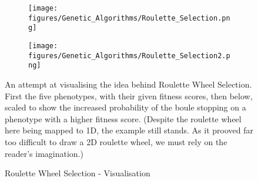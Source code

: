 \begin{figure}[H]
    \centering
    \begin{subfigure}[b]{0.8\textwidth}
        \centering
        \texttt{[image: figures/Genetic\_Algorithms/Roulette\_Selection.png]}
    \end{subfigure}
    \begin{subfigure}[b]{0.8\textwidth}
        \centering
        \texttt{[image: figures/Genetic\_Algorithms/Roulette\_Selection2.png]}
    \end{subfigure}
    
    \caption{Roulette Wheel Selection - Visualisation}
    \small
    \raggedright
    An attempt at visualising the idea behind Roulette Wheel Selection. First the five phenotypes, with their given fitness scores, then below, scaled to show the increased probability of the boule stopping on a phenotype with a higher fitness score. (Despite the roulette wheel here being mapped to 1D, the example still stands. As it prooved far too difficult to draw a 2D roulette wheel, we must rely on the reader's imagination.)
    \label{fig:GA_Roulette_Selection}
\end{figure}

